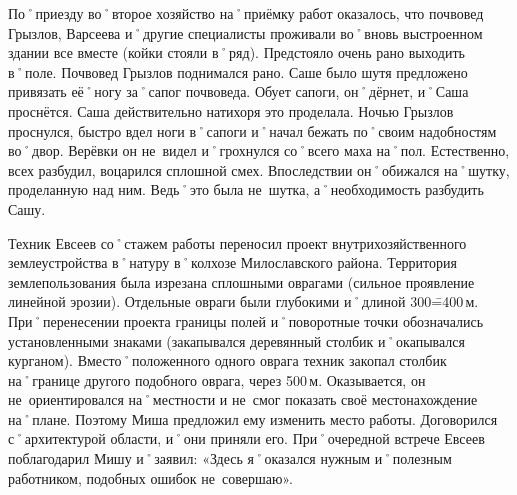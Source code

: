 По˚приезду во˚второе хозяйство на˚приёмку работ оказалось, что почвовед Грызлов, Варсеева и˚другие специалисты проживали во˚вновь выстроенном здании все вместе (койки стояли в˚ряд). Предстояло очень рано выходить в˚поле. Почвовед Грызлов поднимался рано. Саше было шутя предложено привязать её˚ногу за˚сапог почвоведа. Обует сапоги, он˚дёрнет, и˚Саша проснётся. Саша действительно натихоря это проделала. Ночью Грызлов проснулся, быстро вдел ноги в˚сапоги и˚начал бежать по˚своим надобностям во˚двор. Верёвки он не~видел и˚грохнулся со˚всего маха на˚пол. Естественно, всех разбудил, воцарился сплошной смех. Впоследствии он˚обижался на˚шутку, проделанную над ним. Ведь˚это была не~шутка, а˚необходимость разбудить Сашу.

Техник Евсеев со˚стажем работы переносил проект внутрихозяйственного землеустройства в˚натуру в˚колхозе Милославского района. Территория землепользования была изрезана сплошными оврагами (сильное проявление линейной эрозии). Отдельные овраги были глубокими и˚длиной 300\==400\,м. При˚перенесении проекта границы полей и˚поворотные точки обозначались установленными знаками (закапывался деревянный столбик и˚окапывался курганом). Вместо˚положенного одного оврага техник закопал столбик на˚границе другого подобного оврага, через 500\,м. Оказывается, он не~ориентировался на˚местности и не~смог показать своё местонахождение на˚плане. Поэтому Миша предложил ему изменить место работы. Договорился с˚архитектурой области, и˚они приняли его. При˚очередной встрече Евсеев поблагодарил Мишу и˚заявил: «Здесь я˚оказался нужным и˚полезным работником, подобных ошибок не~совершаю».

